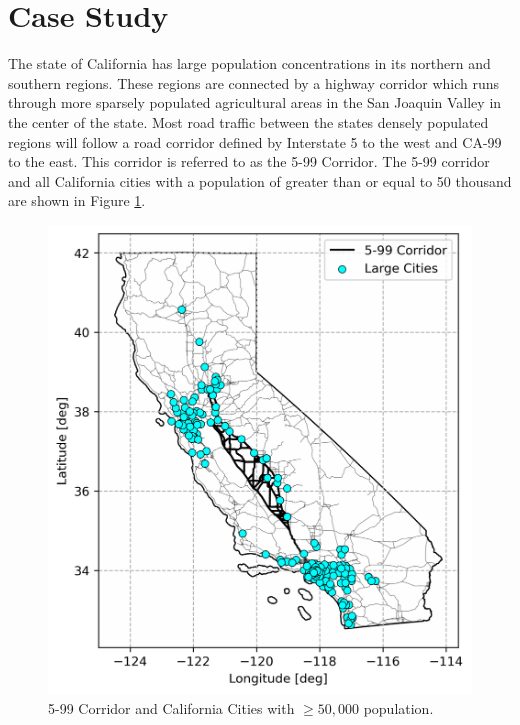 \section{Case Study}


The state of California has large population concentrations in its northern and southern regions. These regions are connected by a highway corridor which runs through more sparsely populated agricultural areas in the San Joaquin Valley in the center of the state. Most road traffic between the states densely populated regions will follow a road corridor defined by Interstate 5 to the west and CA-99 to the east. This corridor is referred to as the 5-99 Corridor. The 5-99 corridor and all California cities with a population of greater than or equal to 50 thousand are shown in Figure \ref{fig:places_corridor}.

\begin{figure}[H]
	\centering
	\includegraphics[width = \linewidth]{./figures/places_corridor.png}
	\caption{5-99 Corridor and California Cities with $\geq 50,000$ population.}
	\label{fig:places_corridor}
\end{figure}

